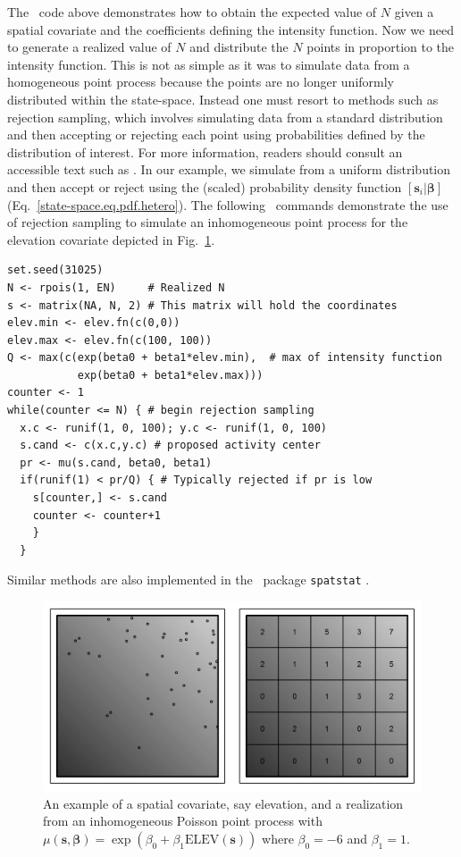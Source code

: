 The \R~code above demonstrates how to obtain the expected value
of $N$ given a spatial covariate and the coefficients defining the
intensity function. Now we need to generate a realized value of $N$
and distribute the $N$ points in proportion to the intensity
function. This is not as simple as it was to simulate data from a homogeneous point process
because the points are no longer uniformly distributed within the
state-space. Instead one must resort to methods such as rejection sampling, which involves
simulating data from a standard distribution and then accepting or
rejecting each point using probabilities defined by the distribution
of interest. For more information, readers should consult an
accessible text such as \citet{robert_casella:2010}. In our example, we
simulate from a uniform distribution and then accept or reject using
the (scaled) probability density function
$[\mathbf{s}_i | \bm{\beta}]$
(Eq.~\ref{state-space.eq.pdf.hetero}). The following \R~commands
demonstrate the use of
rejection sampling to simulate an inhomogeneous point process for the
elevation covariate depicted in
Fig.~\ref{state-space.fig.hetero}.
  \begin{small}
\begin{verbatim}
set.seed(31025)
N <- rpois(1, EN)     # Realized N
s <- matrix(NA, N, 2) # This matrix will hold the coordinates
elev.min <- elev.fn(c(0,0))
elev.max <- elev.fn(c(100, 100))
Q <- max(c(exp(beta0 + beta1*elev.min),  # max of intensity function
           exp(beta0 + beta1*elev.max)))
counter <- 1
while(counter <= N) { # begin rejection sampling
  x.c <- runif(1, 0, 100); y.c <- runif(1, 0, 100)
  s.cand <- c(x.c,y.c) # proposed activity center
  pr <- mu(s.cand, beta0, beta1)
  if(runif(1) < pr/Q) { # Typically rejected if pr is low
    s[counter,] <- s.cand
    counter <- counter+1
    }
  }
\end{verbatim}
  \end{small}
Similar methods are also
implemented in the \R~package \texttt{spatstat} \citep{baddeley_turner:2005}.
\begin{figure}%
\centering
\includegraphics[width=\textwidth]{Ch11-Statespace/figs/heteroPlots}
\caption{An example of a spatial covariate, say elevation, and a
  realization from an inhomogeneous Poisson point process with
  $\mu(\mathbf{s}, \bm{\beta}) = \exp(\beta_0 + \beta_1
  \mbox{ELEV}(\mathbf{s}))$ where $\beta_0=-6$ and $\beta_1=1$.}
\label{state-space.fig.hetero}
\end{figure}

